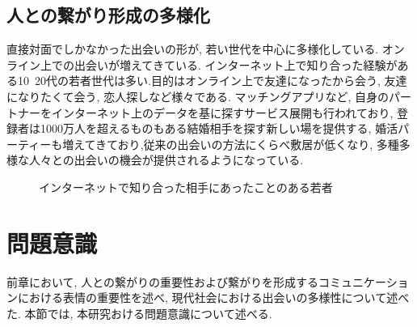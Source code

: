 \subsection{人との繋がり形成の多様化}
直接対面でしかなかった出会いの形が, 若い世代を中心に多様化している. オンライン上での出会いが増えてきている. インターネット上で知り合った経験がある10~20代の若者世代は多い.\cite{mandam}目的はオンライン上で友達になったから会う, 友達になりたくて会う, 恋人探しなど様々である.
マッチングアプリなど, 自身のパートナーをインターネット上のデータを基に探すサービス展開も行われており, 登録者は1000万人を超えるものもある結婚相手を探す新しい場を提供する, 婚活パーティーも増えてきており\cite{chane_claire},従来の出会いの方法にくらべ敷居が低くなり, 多種多様な人々との出会いの機会が提供されるようになっている.

\begin{figure}[htbp]
    \begin{center}
    \end{center}
    \caption{インターネットで知り合った相手にあったことのある若者}
    \label{fig:onlinemeeting_to_real}
\end{figure}



\section{問題意識}
前章において, 人との繋がりの重要性および繋がりを形成するコミュニケーションにおける表情の重要性を述べ, 現代社会における出会いの多様性について述べた.
本節では, 本研究おける問題意識について述べる.
